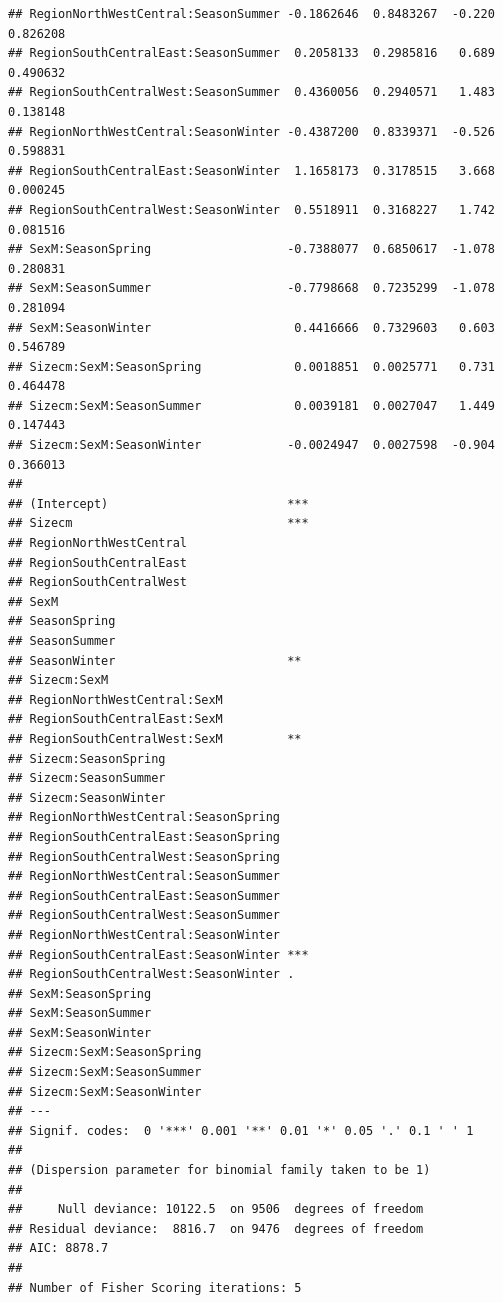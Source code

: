 \documentclass{article}\usepackage[]{graphicx}\usepackage[]{color}
\makeatletter
\newenvironment{kframe}{%
 \def\at@end@of@kframe{}%
 \ifinner\ifhmode%
  \def\at@end@of@kframe{\end{minipage}}%
  \begin{minipage}{\columnwidth}%
 \fi\fi%
 \def\FrameCommand##1{\hskip\@totalleftmargin \hskip-\fboxsep
 \colorbox{shadecolor}{##1}\hskip-\fboxsep
     \hskip-\linewidth \hskip-\@totalleftmargin \hskip\columnwidth}%
 \MakeFramed {\advance\hsize-\width
   \@totalleftmargin\z@ \linewidth\hsize
   \@setminipage}}%
 {\par\unskip\endMakeFramed%
 \at@end@of@kframe}
\newenvironment{knitrout}{}{} %
\makeatother
\begin{document}
\begin{knitrout}
\begin{kframe}
\begin{verbatim}
## RegionNorthWestCentral:SeasonSummer -0.1862646  0.8483267  -0.220 0.826208
## RegionSouthCentralEast:SeasonSummer  0.2058133  0.2985816   0.689 0.490632
## RegionSouthCentralWest:SeasonSummer  0.4360056  0.2940571   1.483 0.138148
## RegionNorthWestCentral:SeasonWinter -0.4387200  0.8339371  -0.526 0.598831
## RegionSouthCentralEast:SeasonWinter  1.1658173  0.3178515   3.668 0.000245
## RegionSouthCentralWest:SeasonWinter  0.5518911  0.3168227   1.742 0.081516
## SexM:SeasonSpring                   -0.7388077  0.6850617  -1.078 0.280831
## SexM:SeasonSummer                   -0.7798668  0.7235299  -1.078 0.281094
## SexM:SeasonWinter                    0.4416666  0.7329603   0.603 0.546789
## Sizecm:SexM:SeasonSpring             0.0018851  0.0025771   0.731 0.464478
## Sizecm:SexM:SeasonSummer             0.0039181  0.0027047   1.449 0.147443
## Sizecm:SexM:SeasonWinter            -0.0024947  0.0027598  -0.904 0.366013
##                                        
## (Intercept)                         ***
## Sizecm                              ***
## RegionNorthWestCentral                 
## RegionSouthCentralEast                 
## RegionSouthCentralWest                 
## SexM                                   
## SeasonSpring                           
## SeasonSummer                           
## SeasonWinter                        ** 
## Sizecm:SexM                            
## RegionNorthWestCentral:SexM            
## RegionSouthCentralEast:SexM            
## RegionSouthCentralWest:SexM         ** 
## Sizecm:SeasonSpring                    
## Sizecm:SeasonSummer                    
## Sizecm:SeasonWinter                    
## RegionNorthWestCentral:SeasonSpring    
## RegionSouthCentralEast:SeasonSpring    
## RegionSouthCentralWest:SeasonSpring    
## RegionNorthWestCentral:SeasonSummer    
## RegionSouthCentralEast:SeasonSummer    
## RegionSouthCentralWest:SeasonSummer    
## RegionNorthWestCentral:SeasonWinter    
## RegionSouthCentralEast:SeasonWinter ***
## RegionSouthCentralWest:SeasonWinter .  
## SexM:SeasonSpring                      
## SexM:SeasonSummer                      
## SexM:SeasonWinter                      
## Sizecm:SexM:SeasonSpring               
## Sizecm:SexM:SeasonSummer               
## Sizecm:SexM:SeasonWinter               
## ---
## Signif. codes:  0 '***' 0.001 '**' 0.01 '*' 0.05 '.' 0.1 ' ' 1
## 
## (Dispersion parameter for binomial family taken to be 1)
## 
##     Null deviance: 10122.5  on 9506  degrees of freedom
## Residual deviance:  8816.7  on 9476  degrees of freedom
## AIC: 8878.7
## 
## Number of Fisher Scoring iterations: 5
\end{verbatim}
\end{kframe}
\end{knitrout}
\end{document}
